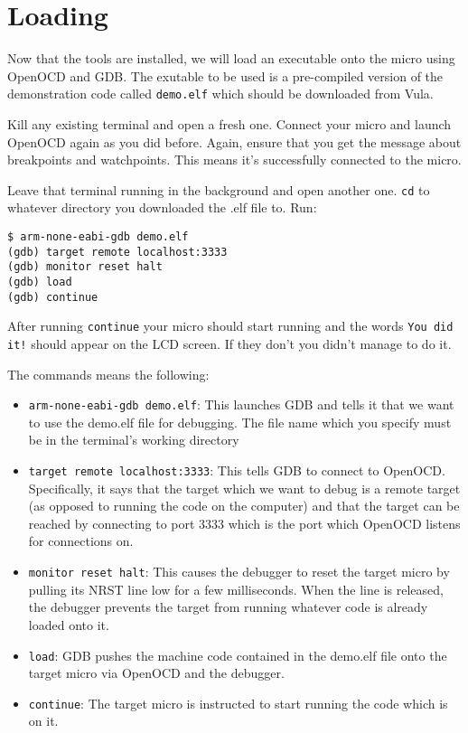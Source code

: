 \chapter{Loading}
Now that the tools are installed, we will load an executable onto the micro using OpenOCD and GDB. The exutable to be used is a pre-compiled version of the demonstration code called \texttt{demo.elf} which should be downloaded from Vula.

Kill any existing terminal and open a fresh one. Connect your micro and launch OpenOCD again as you did before. Again, ensure that you get the message about breakpoints and watchpoints. This means it's successfully connected to the micro.

Leave that terminal running in the background and open another one. \texttt{cd} to whatever directory you downloaded the .elf file to. Run:
\begin{lstlisting}[style=BashStyle]
$ arm-none-eabi-gdb demo.elf
(gdb) target remote localhost:3333
(gdb) monitor reset halt
(gdb) load
(gdb) continue
\end{lstlisting}
After running \texttt{continue} your micro should start running and the words \texttt{You did it!} should appear on the LCD screen. If they don't you didn't manage to do it.

The commands means the following:
\begin{itemize}
\item \texttt{arm-none-eabi-gdb demo.elf}: This launches GDB and tells it that we want to use the demo.elf file for debugging. The file name which you specify must be in the terminal's working directory
\item \texttt{target remote localhost:3333}: This tells GDB to connect to OpenOCD. Specifically, it says that the target which we want to debug is a remote target (as opposed to running the code on the computer) and that the target can be reached by connecting to port 3333 which is the port which OpenOCD listens for connections on.
\item \texttt{monitor reset halt}: This causes the debugger to reset the target micro by pulling its NRST line low for a few milliseconds. When the line is released, the debugger prevents the target from running whatever code is already loaded onto it.
\item \texttt{load}: GDB pushes the machine code contained in the demo.elf file onto the target micro via OpenOCD and the debugger.
\item \texttt{continue}: The target micro is instructed to start running the code which is on it. 
\end{itemize}


